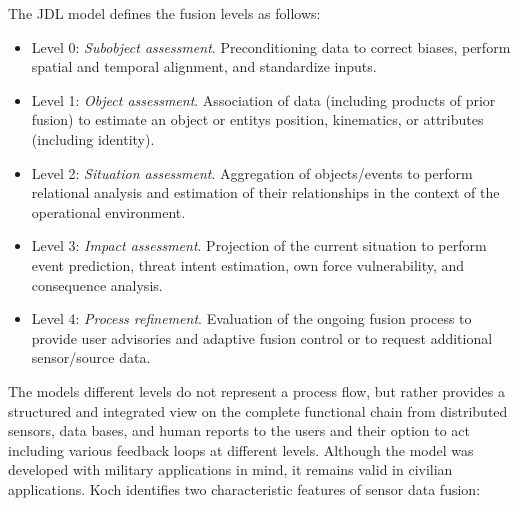 The JDL model defines the fusion levels as follows:
\begin{itemize}
    \item Level 0: \textit{Subobject assessment}. Preconditioning data to correct biases, perform spatial and temporal alignment, and standardize inputs.
    \item Level 1: \textit{Object assessment}. Association of data (including products of prior fusion) to estimate an object or entitys position, kinematics, or attributes (including identity).
    \item Level 2: \textit{Situation assessment}. Aggregation of objects/events to perform relational analysis and estimation of their relationships in the context of the operational environment.
    \item Level 3: \textit{Impact assessment}. Projection of the current situation to perform event prediction, threat intent estimation, own force vulnerability, and consequence analysis.
    \item Level 4: \textit{Process refinement}. Evaluation of the ongoing fusion process to provide user advisories and adaptive fusion control or to request additional sensor/source data.
\end{itemize}
The models different levels do not represent a process flow, but rather provides a structured and integrated view on the complete functional chain from distributed sensors, data bases, and human reports to the users and their option to act including various feedback loops at different levels. Although the model was developed with military applications in mind, it remains valid in civilian applications. Koch \cite{sensorFusion1} identifies two characteristic features of sensor data fusion:
